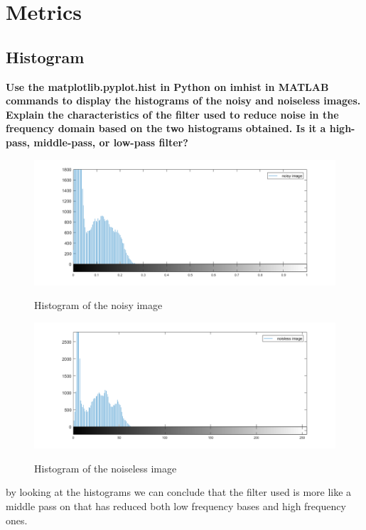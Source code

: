 \documentclass[11pt]{article}
\begin{document}
\section{Metrics}
\subsection{Histogram}
\textbf{Use the matplotlib.pyplot.hist in Python on imhist in MATLAB commands to display the
histograms of the noisy and noiseless images. Explain the characteristics of the filter used to
reduce noise in the frequency domain based on the two histograms obtained. Is it a high-pass,
middle-pass, or low-pass filter?} \\
\begin{figure}[H]
    \begin{center}
        \includegraphics[scale=0.5]{Fig/noisy.hist.png}
        \label{fig:noisyHist}
        \caption{Histogram of the noisy image}
    \end{center}
\end{figure}

\begin{figure}[H]
    \begin{center}
        \includegraphics[scale=0.5]{Fig/noisless.hist.png}
        \label{fig:noislessHist}
        \caption{Histogram of the noiseless image}
    \end{center}
\end{figure}
by looking at the histograms we can conclude that the filter used is more like a middle pass on that has reduced both low
frequency bases and high frequency ones.
\end{document}
